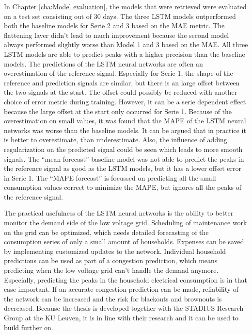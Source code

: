 In Chapter \ref{cha:Model evaluation}, the models that were retrieved were evaluated on a test set consisting out of 30 days. The three LSTM models outperformed both the baseline models for Serie 2 and 3 based on the MAE metric. The flattening layer didn't lead to much improvement because the second model always performed slightly worse than Model 1 and 3 based on the MAE. All three LSTM models are able to predict peaks with a higher precision than the baseline models. The predictions of the LSTM neural networks are often an overestimation of the reference signal. Especially for Serie 1, the shape of the reference and prediction signals are similar, but there is an large offset between the two signals at the start. The offset could possibly be reduced with another choice of error metric during training. However, it can be a serie dependent effect because the large offset at the start only occurred for Serie 1. Because of the overestimation on small values, it was found that the MAPE of the LSTM neural networks was worse than the baseline models. It can be argued that in practice it is better to overestimate, than underestimate. Also, the influence of adding regularization on the predicted signal could be seen which leads to more smooth signals. The ``mean forecast'' baseline model was not able to predict the peaks in the reference signal as good as the LSTM models, but it has a lower offset error in Serie 1. The ``MAPE forecast'' is focussed on predicting all the small consumption values correct to minimize the MAPE, but ignores all the peaks of the reference signal.

The practical usefulness of the LSTM neural networks is the ability to better monitor the demand side of the low voltage grid. Scheduling of maintenance work on the grid can be optimized, which needs detailed forecasting of the consumption series of only a small amount of households. Expenses can be saved by implementing customized updates to the network. Individual household predictions can be used as part of a congestion prediction, which means predicting when the low voltage grid can't handle the demand anymore. Especially, predicting the peaks in the household electrical consumption is in that case important. If an accurate congestion prediction can be made, reliability of the network can be increased and the risk for blackouts and brownouts is decreased. Because the thesis is developed together with the STADIUS Research Group at the KU Leuven, it is in line with their research and it can be used to build further on.\\

